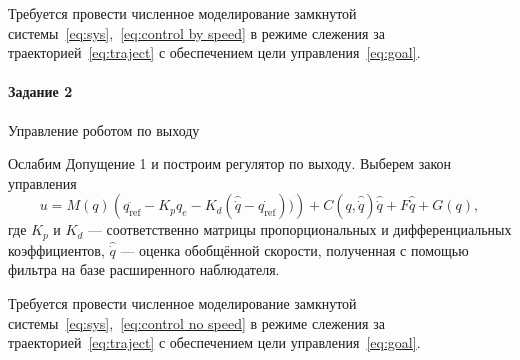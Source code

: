 \documentclass[14pt]{extarticle}
\begin{document}
    Требуется провести численное моделирование замкнутой системы~\eqref{eq:sys},~\eqref{eq:control by speed}
    в режиме слежения за траекторией~\eqref{eq:traject} с обеспечением цели управления~\eqref{eq:goal}.

    \paragraph*{Задание 2} Управление роботом по выходу

    Ослабим Допущение 1 и построим регулятор по выходу. Выберем закон управления
    \begin{equation}
        \label{eq:control no speed}
        u = M(q)\left( \ddot{q_\text{ref}} - K_p q_e - K_d \left( \hat{\dot{q}} - \dot{q_\text{ref}} \right)) \right) + C(q, \hat{\dot{q}})\hat{\dot{q}} + F\hat{\dot{q}} + G(q),
    \end{equation} где $K_p$ и $K_d$ --- соответственно матрицы пропорциональных и дифференциальных коэффициентов,
    $\hat{\dot{q}}$ --- оценка обобщённой скорости, полученная с помощью фильтра на базе расширенного наблюдателя.

    Требуется провести численное моделирование замкнутой системы~\eqref{eq:sys},~\eqref{eq:control no speed}
    в режиме слежения за траекторией~\eqref{eq:traject} с обеспечением цели управления~\eqref{eq:goal}.
\end{document}
